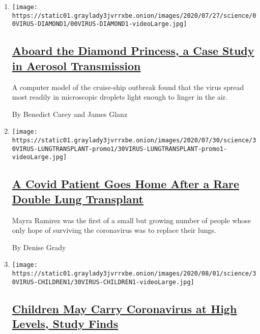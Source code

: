 \begin{enumerate}
\def\labelenumi{\arabic{enumi}.}
\item
  \texttt{[image: https://static01.graylady3jvrrxbe.onion/images/2020/07/27/science/00VIRUS-DIAMOND1/00VIRUS-DIAMOND1-videoLarge.jpg]}

  \hypertarget{aboard-the-diamond-princess-a-case-study-in-aerosol-transmission}{%
  \subsection{\texorpdfstring{\href{/2020/07/30/health/diamond-princess-coronavirus-aerosol.html}{Aboard
  the Diamond Princess, a Case Study in Aerosol
  Transmission}}{Aboard the Diamond Princess, a Case Study in Aerosol Transmission}}\label{aboard-the-diamond-princess-a-case-study-in-aerosol-transmission}}

  A computer model of the cruise-ship outbreak found that the virus
  spread most readily in microscopic droplets light enough to linger in
  the air.

  By Benedict Carey and James Glanz
\item
  \texttt{[image: https://static01.graylady3jvrrxbe.onion/images/2020/07/30/science/30VIRUS-LUNGTRANSPLANT-promo1/30VIRUS-LUNGTRANSPLANT-promo1-videoLarge.jpg]}

  \hypertarget{a-covid-patient-goes-home-after-a-rare-double-lung-transplant}{%
  \subsection{\texorpdfstring{\href{/2020/07/30/health/Covid-lung-transplant.html}{A
  Covid Patient Goes Home After a Rare Double Lung
  Transplant}}{A Covid Patient Goes Home After a Rare Double Lung Transplant}}\label{a-covid-patient-goes-home-after-a-rare-double-lung-transplant}}

  Mayra Ramirez was the first of a small but growing number of people
  whose only hope of surviving the coronavirus was to replace their
  lungs.

  By Denise Grady
\item
  \texttt{[image: https://static01.graylady3jvrrxbe.onion/images/2020/08/01/science/30VIRUS-CHILDREN1/30VIRUS-CHILDREN1-videoLarge.jpg]}

  \hypertarget{children-may-carry-coronavirus-at-high-levels-study-finds}{%
  \subsection{\texorpdfstring{\href{/2020/07/30/health/coronavirus-children.html}{Children
  May Carry Coronavirus at High Levels, Study
  Finds}}{Children May Carry Coronavirus at High Levels, Study Finds}}\label{children-may-carry-coronavirus-at-high-levels-study-finds}}


\end{enumerate}
